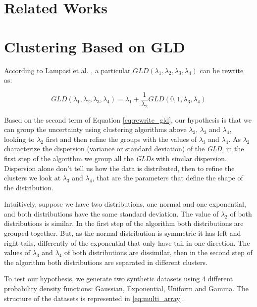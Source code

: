  \section{Related Works}\label{sec:related_works}

\cite{Jiang2011}

\section{Clustering Based on GLD}\label{sec:clustering_gld}

According to Lampasi et al. \cite{Lampasi2006}, a particular $GLD(\lambda_{1},\lambda_{2},\lambda_{3},\lambda_{4})$ can be rewrite as: 

\begin{equation}\label{eq:rewrite_gld}
GLD(\lambda_{1},\lambda_{2},\lambda_{3},\lambda_{4}) = \lambda_{1} + \frac{1}{\lambda_{2}}GLD(0,1,\lambda_{3},\lambda_{4}) 
\end{equation}

Based on the second term of Equation \ref{eq:rewrite_gld}, our hypothesis is that we can group the uncertainty using clustering algorithms above $\lambda_{2}$, $\lambda_{3}$ and $\lambda_{4}$, looking to $\lambda_{2}$ first and then refine the groups with the values of $\lambda_{3}$ and $\lambda_{4}$. As $\lambda_{2}$ characterize the dispersion (variance or standard deviation) of the \textit{GLD}, in the first step of the algorithm we group all the \textit{GLDs} with similar dispersion. Dispersion alone don't tell us how the data is distributed, then to refine the clusters we look at $\lambda_{3}$ and $\lambda_{4}$, that are the parameters that define the shape of the distribution.   

Intuitively, suppose we have two distributions, one normal and one exponential, and both distributions have the same standard deviation. The value of $\lambda_{2}$ of both distributions is similar. In the first step of the algorithm both distributions are grouped together. But, as the normal distribution is symmetric it has left and right tails, differently of the exponential that only have tail in one direction. The values of $\lambda_{3}$ and $\lambda_{4}$ of both distributions are dissimilar, then in the second step of the algorithm both distributions are separated in different clusters.   

To test our hypothesis, we generate two synthetic datasets using 4 different probability density functions: Gaussian, Exponential, Uniform and Gamma. The structure of the datasets is represented in \ref{eq:multi_array}.  

